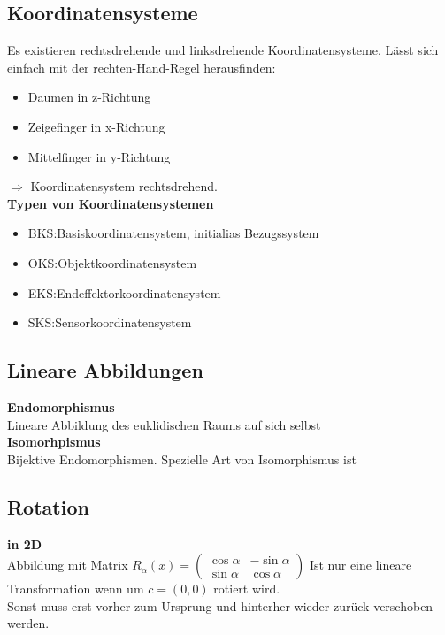 \subsection{Koordinatensysteme}
Es existieren rechtsdrehende und linksdrehende Koordinatensysteme. Lässt sich einfach mit der rechten-Hand-Regel herausfinden:
\begin{itemize}
  \item Daumen in z-Richtung
  \item Zeigefinger in x-Richtung
  \item Mittelfinger in y-Richtung
\end{itemize}
\(\Rightarrow\) Koordinatensystem rechtsdrehend.\\

\textbf{Typen von Koordinatensystemen}
\begin{itemize}
  \item BKS:\@ Basiskoordinatensystem, initialias Bezugssystem
  \item OKS:\@ Objektkoordinatensystem
  \item EKS:\@ Endeffektorkoordinatensystem
  \item SKS:\@ Sensorkoordinatensystem
\end{itemize}

\subsection{Lineare Abbildungen}
\textbf{Endomorphismus}\\
Lineare Abbildung des euklidischen Raums auf sich selbst\\

\textbf{Isomorhpismus}\\
Bijektive Endomorphismen. Spezielle Art von Isomorphismus ist \SO{}

\subsection{Rotation}
\textbf{in 2D}\\
Abbildung mit Matrix \(R_\alpha(x) = \begin{pmatrix} \cos \alpha & -\sin\alpha \\ \sin \alpha & \cos \alpha\end{pmatrix}\)
Ist nur eine lineare Transformation wenn um \(c=(0,0)\) rotiert wird.\\
Sonst muss erst vorher zum Ursprung und hinterher wieder zurück verschoben werden.\\

